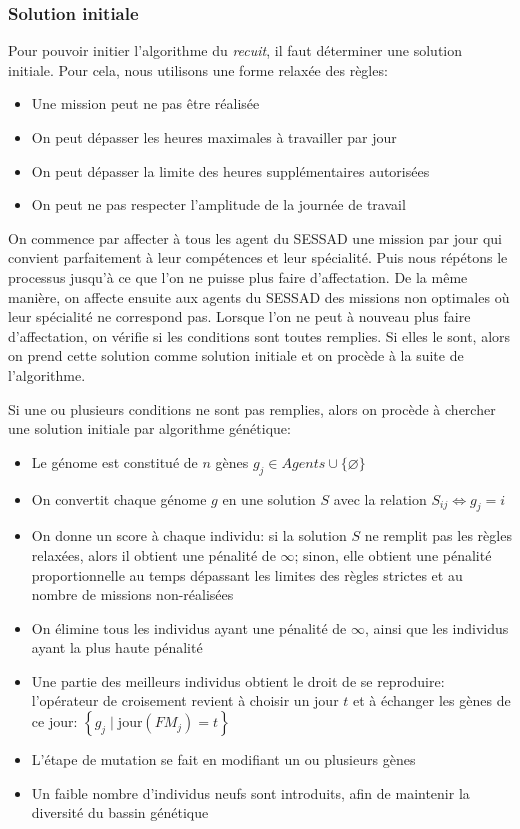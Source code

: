 \documentclass[11pt]{article}
\begin{document}
\subsubsection{Solution initiale}

Pour pouvoir initier l'algorithme du \emph{recuit}, il faut déterminer une solution initiale.
Pour cela, nous utilisons une forme relaxée des règles:

\begin{itemize}
    \item Une mission peut ne pas être réalisée
    \item On peut dépasser les heures maximales à travailler par jour
    \item On peut dépasser la limite des heures supplémentaires autorisées
    \item On peut ne pas respecter l'amplitude de la journée de travail
\end{itemize}

On commence par affecter à tous les agent du SESSAD une mission par jour qui convient parfaitement à leur compétences et leur spécialité.
Puis nous répétons le processus jusqu'à ce que l'on ne puisse plus faire d'affectation.
De la même manière, on affecte ensuite aux agents du SESSAD des missions non optimales où leur spécialité ne correspond pas.
Lorsque l'on ne peut à nouveau plus faire d'affectation, on vérifie si les conditions sont toutes remplies.
Si elles le sont, alors on prend cette solution comme solution initiale et on procède à la suite de l'algorithme.

Si une ou plusieurs conditions ne sont pas remplies, alors on procède à chercher une solution initiale par algorithme génétique:

\begin{itemize}
    \item Le génome est constitué de $n$ gènes $g_j \in Agents \cup \{ \varnothing \}$
    \item On convertit chaque génome $g$ en une solution $S$ avec la relation $S_{ij} \Leftrightarrow g_j = i$
    \item On donne un score à chaque individu: si la solution $S$ ne remplit pas les règles relaxées, alors il obtient une pénalité de $\infty$; sinon, elle obtient une pénalité proportionnelle au temps dépassant les limites des règles strictes et au nombre de missions non-réalisées
    \item On élimine tous les individus ayant une pénalité de $\infty$, ainsi que les individus ayant la plus haute pénalité
    \item Une partie des meilleurs individus obtient le droit de se reproduire: l'opérateur de croisement revient à choisir un jour $t$ et à échanger les gènes de ce jour: $\left\{g_j \;|\; \text{jour}(FM_j) = t \right\}$
    \item L'étape de mutation se fait en modifiant un ou plusieurs gènes
    \item Un faible nombre d'individus neufs sont introduits, afin de maintenir la diversité du bassin génétique
\end{itemize}
\end{document}
